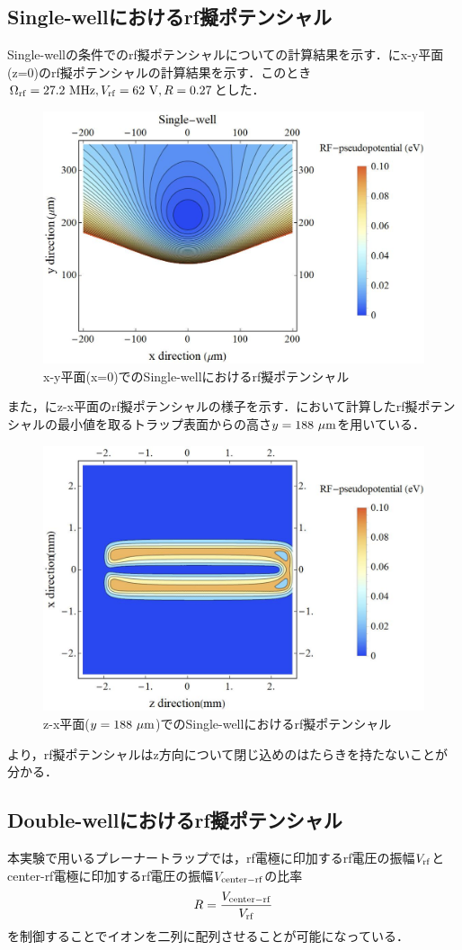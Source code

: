 \subsection{Single-wellにおけるrf擬ポテンシャル}
Single-wellの条件でのrf擬ポテンシャルについての計算結果を示す．にx-y平面(z=0)のrf擬ポテンシャルの計算結果を示す．このとき$\Omega_{\rm rf} = 27.2 \ {\rm MHz}, V_{\rm rf} = 62 \ {\rm V},R = 0.27$とした．
\begin{figure}[h]
	\begin{center}
	\includegraphics[width = 0.5\linewidth]{./simulation/figure/Single-well_Contour_xy@z=0.jpg}
	\caption{x-y平面(x=0)でのSingle-wellにおけるrf擬ポテンシャル}
	\label{fig:single-well_example_xy}
	\end{center}
\end{figure}
また，にz-x平面のrf擬ポテンシャルの様子を示す．において計算したrf擬ポテンシャルの最小値を取るトラップ表面からの高さ$y = 188 \ {\rm \mu m}$を用いている．
\begin{figure}[h]
	\begin{center}
	\includegraphics[width = 0.5\linewidth]{./simulation/figure/single-well_zx.jpg}
	\caption{z-x平面($y = 188 \ {\rm \mu m}$)でのSingle-wellにおけるrf擬ポテンシャル}
	\label{fig:single-well_example_zx}
	\end{center}
\end{figure}
より，rf擬ポテンシャルはz方向について閉じ込めのはたらきを持たないことが分かる．
\clearpage

\subsection{Double-wellにおけるrf擬ポテンシャル}
本実験で用いるプレーナートラップでは，rf電極に印加するrf電圧の振幅$V_{\rm rf}$とcenter-rf電極に印加するrf電圧の振幅$V_{\rm center-rf}$の比率
\large
\begin{align}
R = \frac{V_{\rm center-rf}}{V_{\rm rf}}
\end{align}
\normalsize
を制御することでイオンを二列に配列させることが可能になっている．

